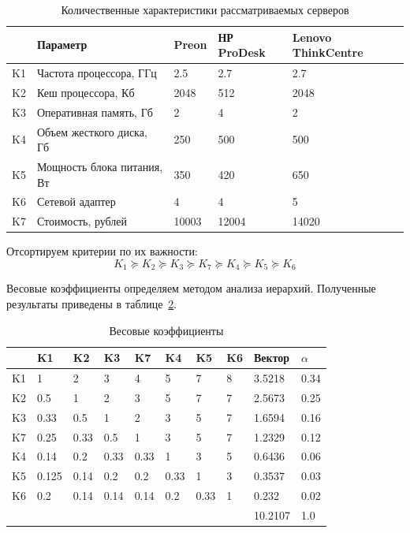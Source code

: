 \documentclass[russian,utf8,emptystyle]{eskdtext}
\begin{document}
\begin{longtable}{p{1.5cm}|p{7cm}|p{2cm}|p{2cm}|p{2cm}}
\caption{Количественные характеристики рассматриваемых серверов}
\label{tab:server-2} \\
            & Параметр                     & Preon      & НР ProDesk & Lenovo ThinkCentre \\ 
\hline 
K1          & Частота процессора, ГГц      & 2.5        & 2.7        & 2.7      \\ 
K2          & Кеш процессора, Кб           & 2048       & 512        & 2048     \\
K3          & Оперативная память, Гб       & 2          & 4          & 2        \\ 
K4          & Объем жесткого диска, Гб     & 250        & 500        & 500      \\ 
K5          & Мощность блока питания, Вт   & 350        & 420        & 650      \\ 
K6          & Сетевой адаптер              & 4          & 4          & 5        \\ 
K7          & Стоимость, рублей            & 10003      & 12004      & 14020    \\
\end{longtable}

Отсортируем критерии по их важности:
$$
K_1 \succeq K_2 \succeq K_3 \succeq K_7 \succeq K_4 \succeq K_5 \succeq K_6
$$

Весовые коэффициенты определяем методом анализа иерархий. Полученные результаты приведены в таблице~\ref{tab:server-3}.

\begin{longtable}{p{1cm}|p{1cm}|p{1cm}|p{1cm}|p{1cm}|p{1cm}|p{1cm}|p{1cm}|p{2cm}|p{2cm}}
\caption{Весовые коэффициенты}
\label{tab:server-3} \\
   & K1    & K2   & K3   & K7   & K4   & K5   & K6 & Вектор & $\alpha$  \\
\hline 
K1 & 1     & 2    & 3    & 4    & 5    & 7    & 8  & 3.5218 & 0.34      \\ 
K2 & 0.5   & 1    & 2    & 3    & 5    & 7    & 7  & 2.5673 & 0.25      \\ 
K3 & 0.33  & 0.5  & 1    & 2    & 3    & 5    & 7  & 1.6594 & 0.16      \\ 
K7 & 0.25  & 0.33 & 0.5  & 1    & 3    & 5    & 7  & 1.2329 & 0.12      \\ 
K4 & 0.14  & 0.2  & 0.33 & 0.33 & 1    & 3    & 5  & 0.6436 & 0.06      \\ 
K5 & 0.125 & 0.14 & 0.2  & 0.2  & 0.33 & 1    & 3  & 0.3537 & 0.03      \\ 
K6 & 0.2   & 0.14 & 0.14 & 0.14 & 0.2  & 0.33 & 1  & 0.232  & 0.02      \\ 
\hline
   &       &      &      &      &      &      &    & 10.2107& 1.0
\end{longtable}
\end{document}
